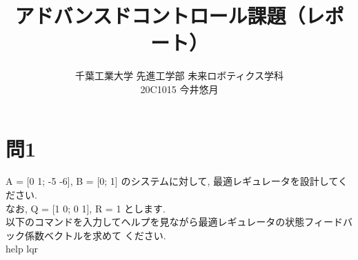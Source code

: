 \documentclass{jsarticle}
\begin{document}
\title{{\vspace*{-30mm}}{\LARGE アドバンスドコントロール課題（レポート）}}
\author{\large 千葉工業大学 先進工学部 未来ロボティクス学科 \vspace*{4mm}\\20C1015 今井悠月}
\date{}
\maketitle

\section*{問1}
A = [0 1; -5 -6], \hspace*{0.5zw}B = [0; 1] のシステムに対して, 最適レギュレータを設計してください.\\
\hspace*{1zw}なお, Q = [1 0; 0 1], \hspace*{0.5zw}R = 1 とします.\\
\hspace*{1zw}以下のコマンドを入力してヘルプを見ながら最適レギュレータの状態フィードバック係数ベクトルを求めて
\hspace*{1zw}ください.\vspace*{2mm}\\
\hspace*{1zw}help lqr\\
\end{document}
